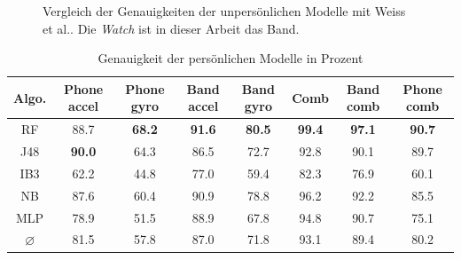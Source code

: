 \begin{figure}
	\centering
	\caption[Vergleich der Genauigkeiten der unpersönlichen Modelle mit Weiss et al.\cite{Weiss2016}]{Vergleich der Genauigkeiten der unpersönlichen Modelle mit Weiss et al.\cite{Weiss2016}. Die \textit{Watch} ist in dieser Arbeit das Band.}
	\label{fig:accuracy-impersonal-vs-weiss}
\end{figure}

\begin{table}
\centering
\footnotesize
\begin{tabular}{|c|c|c|c|c|c|c|c|}
	\hline 
	\textbf{Algo.} & \textbf{Phone accel} & \textbf{Phone gyro} & \textbf{Band accel} & \textbf{Band gyro} & \textbf{Comb} & \textbf{Band comb} & \textbf{Phone comb} \\ 
	\hline 
	RF & 88.7 & \textbf{68.2} & \textbf{91.6} & \textbf{80.5} & \textbf{99.4} & \textbf{97.1} & \textbf{90.7} \\ 
	J48 & \textbf{90.0} & 64.3 & 86.5 & 72.7 & 92.8 & 90.1 & 89.7 \\ 
	IB3 & 62.2 & 44.8 & 77.0 & 59.4 & 82.3 & 76.9 & 60.1 \\ 
	NB & 87.6 & 60.4 & 90.9 & 78.8 & 96.2 & 92.2 & 85.5 \\ 
	MLP & 78.9 & 51.5 & 88.9 & 67.8 & 94.8 & 90.7 & 75.1 \\ 
	\hline 
	$\varnothing$ & 81.5 & 57.8 & 87.0 & 71.8 & 93.1 & 89.4 & 80.2 \\ 
	\hline 
\end{tabular}
\caption{Genauigkeit der persönlichen Modelle in Prozent}
\label{tab:accuracy-personal}
\end{table}

